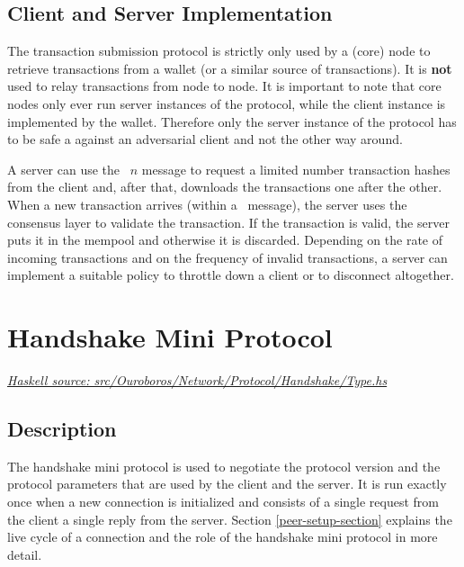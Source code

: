 \documentclass{report}
\newcommand{\hsref}[1]{\href{https://github.com/input-output-hk/ouroboros-network/blob/master/#1}{\emph{Haskell source: #1}}}
\newcommand{\state}[1]{\texttt{#1}}
\newcommand{\msg}[1]{\texttt{#1}}
\theoremstyle{definition}{
  \newtheorem{lemma}{Lemma}[section] %
  \newtheorem{definition}[lemma]{Definition}
}
\theoremstyle{theorem}{
  \newtheorem{invariant}[lemma]{Invariant}
  \newtheorem{proofobligation}[lemma]{Proof Obligation}
}
\numberwithin{equation}{lemma}
\begin{document}
\subsection{Client and Server Implementation}
The transaction submission protocol is strictly only used
by a (core) node to retrieve transactions from a wallet (or a similar source of transactions).
It is {\bf not} used to relay transactions from node to node.
It is important to note that core nodes only ever run server instances of the protocol,
while the client instance is implemented by the wallet.
Therefore only the server instance of the protocol has to be safe a against an adversarial client
and not the other way around.

A server can use the \GetHashes~$n$ message to request a limited number transaction hashes from the client
and, after that, downloads the transactions one after the other.
When a new transaction arrives (within a \Tx~message), the server uses the consensus layer to
validate the transaction.
If the transaction is valid, the server puts it in the mempool and otherwise it is discarded.
Depending on the rate of incoming transactions and on the frequency of invalid transactions,
a server can implement a suitable policy to throttle down a client or to disconnect altogether.


\section{Handshake Mini Protocol}
\hsref{src/Ouroboros/Network/Protocol/Handshake/Type.hs}
\label{handshake-protocol}
\newcommand{\Propose}{\state{Propose}}
\newcommand{\Confirm}{\state{Confirm}}
\newcommand{\ProposeVersions}{\msg{ProposeVersions}}
\newcommand{\AcceptVersion}{\msg{AcceptVersion}}
\newcommand{\Refuse}{\msg{Refuse}}

\newcommand{\VersionMismatch}{\msg{VersionMismatch}}
\newcommand{\HandshakeDecodeError}{\msg{HandshakeDecodeError}}
\newcommand{\Refused}{\msg{Refused}}

\subsection{Description}
The handshake mini protocol is used to negotiate the protocol version
and the protocol parameters that are used by the client and the server.
It is run exactly once when a new connection is initialized
and consists of a single request from the client a single reply from the server.
Section \ref{peer-setup-section} explains the live cycle of a connection and the role of
the handshake mini protocol in more detail.
\end{document}
